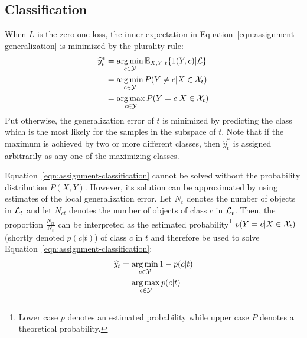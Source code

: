 \subsection{Classification}

When $L$ is the zero-one loss, the inner expectation in Equation~\ref{eqn:assignment-generalization}
is minimized by the plurality rule:
\begin{align}
\widehat{y}_t^* &= \operatorname*{arg\,min}_{c \in {\cal Y}} \mathbb{E}_{X, Y|t}\{ 1(Y, c) | {\cal L} \} \nonumber \\
                &= \operatorname*{arg\,min}_{c \in {\cal Y}} P(Y \neq c | X \in {\cal X}_t) \nonumber \\
                &= \operatorname*{arg\,max}_{c \in {\cal Y}} P(Y = c | X \in {\cal X}_t)\label{eqn:assignment-classification}
\end{align}
Put otherwise, the generalization error of $t$ is minimized by predicting
the class which is the most likely for the samples in the subspace of $t$.
Note that if the maximum is achieved by two or more different classes, then
$\widehat{y}_t^*$ is assigned arbitrarily as any one of the maximizing classes.

Equation~\ref{eqn:assignment-classification} cannot be solved without the
probability distribution $P(X, Y)$. However, its solution can be approximated
by using estimates of the local generalization error. Let $N_t$ denotes the
number of objects in ${\cal L}_t$ and let $N_{ct}$ denotes the number of
objects of class $c$ in ${\cal L}_t$. Then, the proportion
$\tfrac{N_{ct}}{N_t}$ can be interpreted as the estimated
probability\footnote{Lower case $p$ denotes an estimated probability while
upper case $P$ denotes a theoretical probability.} $p(Y=c|X\in{\cal X}_t)$
(shortly denoted $p(c|t)$) of class $c$ in $t$ and therefore be used to solve
Equation~\ref{eqn:assignment-classification}:
\begin{align}\label{eqn:assignement-classification-approx}
\widehat{y}_t &= \operatorname*{arg\,min}_{c \in {\cal Y}} 1 - p(c | t) \nonumber \\
              &= \operatorname*{arg\,max}_{c \in {\cal Y}} p(c | t)
\end{align}

